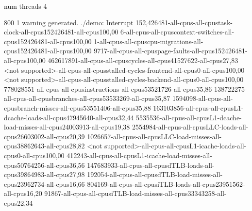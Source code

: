 num threads 4

800
1 warning generated.
./demo: Interrupt
152,426481-all-cpus-all-cpustask-clock-all-cpus152426481-all-cpus100,00
6-all-cpus-all-cpuscontext-switches-all-cpus152426481-all-cpus100,00
1-all-cpus-all-cpuscpu-migrations-all-cpus152426481-all-cpus100,00
9717-all-cpus-all-cpuspage-faults-all-cpus152426481-all-cpus100,00
462617891-all-cpus-all-cpuscycles-all-cpus41527622-all-cpus27,83
<not supported>-all-cpus-all-cpusstalled-cycles-frontend-all-cpus0-all-cpus100,00
<not supported>-all-cpus-all-cpusstalled-cycles-backend-all-cpus0-all-cpus100,00
778028551-all-cpus-all-cpusinstructions-all-cpus53521726-all-cpus35,86
138722275-all-cpus-all-cpusbranches-all-cpus53533269-all-cpus35,87
1594098-all-cpus-all-cpusbranch-misses-all-cpus53551406-all-cpus35,88
163103856-all-cpus-all-cpusL1-dcache-loads-all-cpus47945640-all-cpus32,44
5535536-all-cpus-all-cpusL1-dcache-load-misses-all-cpus24003913-all-cpus19,38
2554984-all-cpus-all-cpusLLC-loads-all-cpus26603002-all-cpus20,39
1026657-all-cpus-all-cpusLLC-load-misses-all-cpus38862643-all-cpus28,82
<not supported>-all-cpus-all-cpusL1-icache-loads-all-cpus0-all-cpus100,00
412243-all-cpus-all-cpusL1-icache-load-misses-all-cpus50764256-all-cpus36,56
147683933-all-cpus-all-cpusdTLB-loads-all-cpus39864983-all-cpus27,98
192054-all-cpus-all-cpusdTLB-load-misses-all-cpus23962734-all-cpus16,66
804169-all-cpus-all-cpusiTLB-loads-all-cpus23951562-all-cpus16,20
91867-all-cpus-all-cpusiTLB-load-misses-all-cpus33343258-all-cpus22,34
